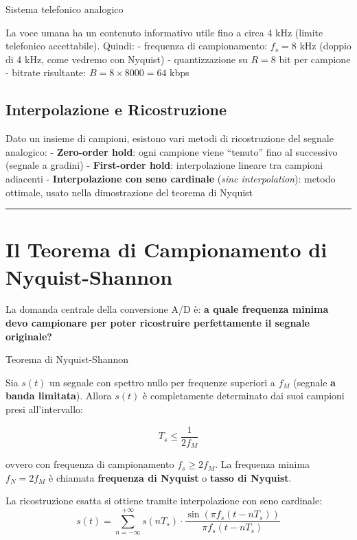 \documentclass[
  italian,
  openany]{book}
\begin{document}
\begin{callouttip}{Sistema telefonico analogico}

La voce umana ha un contenuto informativo utile fino a circa 4 kHz
(limite telefonico accettabile). Quindi: - frequenza di campionamento:
\(f_s = 8\) kHz (doppio di 4 kHz, come vedremo con Nyquist) -
quantizzazione su \(R = 8\) bit per campione - bitrate risultante:
\(B = 8 \times 8000 = 64\) kbps

\end{callouttip}

\subsection{Interpolazione e
Ricostruzione}\label{interpolazione-e-ricostruzione}

Dato un insieme di campioni, esistono vari metodi di ricostruzione del
segnale analogico: - \textbf{Zero-order hold}: ogni campione viene
``tenuto'' fino al successivo (segnale a gradini) - \textbf{First-order
hold}: interpolazione lineare tra campioni adiacenti -
\textbf{Interpolazione con seno cardinale} (\emph{sinc interpolation}):
metodo ottimale, usato nella dimostrazione del teorema di Nyquist

\begin{center}\rule{0.5\linewidth}{0.5pt}\end{center}

\section{Il Teorema di Campionamento di
Nyquist-Shannon}\label{il-teorema-di-campionamento-di-nyquist-shannon}

La domanda centrale della conversione A/D è: \textbf{a quale frequenza
minima devo campionare per poter ricostruire perfettamente il segnale
originale?}

\begin{callouttheorem}{Teorema di Nyquist-Shannon}

Sia \(s(t)\) un segnale con spettro nullo per frequenze superiori a
\(f_M\) (segnale \textbf{a banda limitata}). Allora \(s(t)\) è
completamente determinato dai suoi campioni presi all'intervallo:

\[T_s \leq \frac{1}{2f_M}\]

ovvero con frequenza di campionamento \(f_s \geq 2f_M\). La frequenza
minima \(f_N = 2f_M\) è chiamata \textbf{frequenza di Nyquist} o
\textbf{tasso di Nyquist}.

La ricostruzione esatta si ottiene tramite interpolazione con seno
cardinale:
\[s(t) = \sum_{n=-\infty}^{+\infty} s(nT_s) \cdot \frac{\sin(\pi f_s (t - nT_s))}{\pi f_s (t - nT_s)}\]

\end{callouttheorem}
\end{document}
